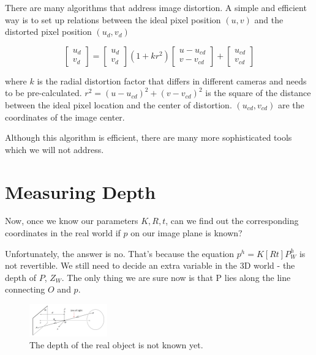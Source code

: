 \documentclass[]{article}
\begin{document}
There are many algorithms that address image distortion. A simple and efficient way is to set up relations between the ideal pixel position $(u,v)$ and the distorted pixel position $(u_d,v_d)$

\begin{equation}
\begin{bmatrix}
    u_d \\
    v_d
\end{bmatrix}
=
\begin{bmatrix}
    u_d \\
    v_d
\end{bmatrix}
(1+kr^2)
\begin{bmatrix}
    u-u_{cd} \\
    v-v_{cd}
\end{bmatrix}
+
\begin{bmatrix}
    u_{cd} \\
    v_{cd}
\end{bmatrix}
\end{equation}

where $k$ is the radial distortion factor that differs in different cameras and needs to be pre-calculated. $r^2=(u-u_{cd})^2+(v-v_{cd})^2$ is the square of the distance between the ideal pixel location and the center of distortion. $(u_{cd},v_{cd})$ are the coordinates of the image center.

Although this algorithm is efficient, there are many more sophisticated tools which we will not address.

\section{Measuring Depth}
Now, once we know our parameters $K,R,t$, can we find out the corresponding coordinates in the real world if $p$ on our image plane is known?

Unfortunately, the answer is no. That's because the equation $p^h=K[R t]P_W^h$ is not revertible. We still need to decide an extra variable in the 3D world - the depth of $P$, $Z_W$. The only thing we are sure now is that P lies along the line connecting $O$ and $p$.

\begin{figure}[H]
\includegraphics[width=0.3\textwidth]{measuring_depth.png}
\centering
\caption{The depth of the real object is not known yet.}
\label{fig:measuring_depth}
\end{figure}
\end{document}
